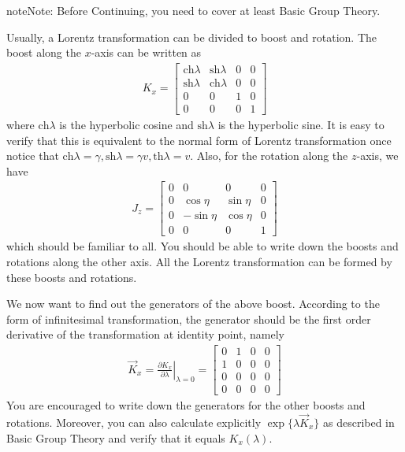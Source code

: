 \documentclass[letterpaper,10pt,english]{sphinxmanual}
\begin{document}
\begin{sphinxadmonition}{note}{Note:}
Before Continuing, you need to cover at least Basic Group Theory.
\end{sphinxadmonition}

Usually, a Lorentz transformation can be divided to boost and rotation. The boost along the \(x\)-axis can be written as
\begin{equation*}
\begin{split}K_x =
\left[
\begin{matrix}
\mathrm{ch}\lambda & \mathrm{sh}\lambda & 0 & 0\\
\mathrm{sh}\lambda & \mathrm{ch}\lambda & 0 & 0\\
0 & 0 & 1 & 0\\
0 & 0 & 0 & 1
\end{matrix}
\right]\end{split}
\end{equation*}
where \(\mathrm{ch}\lambda\) is the hyperbolic cosine and \(\mathrm{sh}\lambda\) is the hyperbolic sine. It is easy to verify that this is equivalent to the normal form of Lorentz transformation once notice that \(\mathrm{ch}\lambda = \gamma, \mathrm{sh}\lambda = \gamma v, \mathrm{th}\lambda = v\). Also, for the rotation along the \(z\)-axis, we have
\begin{equation*}
\begin{split}J_z =
\left[
\begin{matrix}
0 & 0 & 0 & 0\\
0 & \cos\eta& \sin\eta & 0\\
0 & -\sin\eta & \cos\eta & 0\\
0 & 0 & 0 & 1
\end{matrix}
\right]\end{split}
\end{equation*}
which should be familiar to all. You should be able to write down the boosts and rotations along the other axis. All the Lorentz transformation can be formed by these boosts and rotations.

We now want to find out the generators of the above boost. According to the form of infinitesimal transformation, the generator should be the first order derivative of the transformation at identity point, namely
\begin{equation*}
\begin{split}\vec K_x = \left.\frac{\partial K_x}{\partial\lambda}\right|_{\lambda=0} =
\left[
\begin{matrix}
0 & 1 & 0 & 0\\
1 & 0 & 0 & 0\\
0 & 0 & 0 & 0\\
0 & 0 & 0 & 0
\end{matrix}
\right]\end{split}
\end{equation*}
You are encouraged to write down the generators for the other boosts and rotations. Moreover, you can also calculate explicitly \(\exp\{\lambda\vec K_x\}\) as described in Basic Group Theory and verify that it equals \(K_x(\lambda)\).
\end{document}
